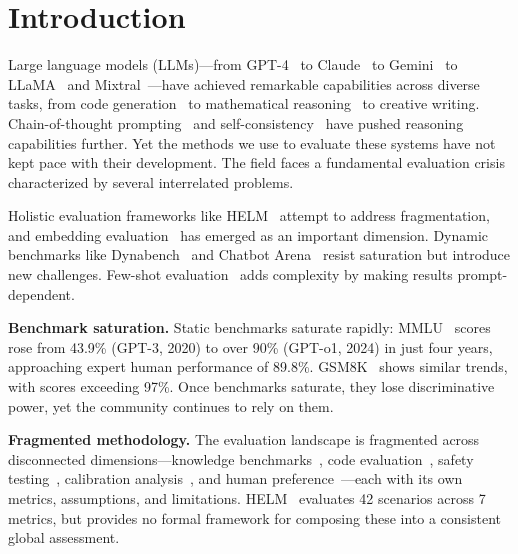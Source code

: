 \documentclass[11pt]{article}
\begin{document}
\section{Introduction}
\label{sec:intro}

Large language models (LLMs)---from GPT-4~\cite{openai2023gpt4} to Claude~\cite{anthropic2024claude3} to Gemini~\cite{gemini2024,geminiteam2024gemini15} to LLaMA~\cite{touvron2023llama,touvron2023llama2,dubey2024llama3} and Mixtral~\cite{jiang2024mixtral}---have achieved remarkable capabilities across diverse tasks, from code generation~\cite{chen2021evaluating} to mathematical reasoning~\cite{cobbe2021gsm8k} to creative writing. Chain-of-thought prompting~\cite{wei2022chain} and self-consistency~\cite{wang2023selfconsistency} have pushed reasoning capabilities further. Yet the methods we use to evaluate these systems have not kept pace with their development. The field faces a fundamental evaluation crisis characterized by several interrelated problems.

Holistic evaluation frameworks like HELM~\cite{liang2022helm} attempt to address fragmentation, and embedding evaluation~\cite{muennighoff2023mteb} has emerged as an important dimension. Dynamic benchmarks like Dynabench~\cite{kiela2021dynabench} and Chatbot Arena~\cite{chiang2024chatbot} resist saturation but introduce new challenges. Few-shot evaluation~\cite{brown2020language,perez2021true} adds complexity by making results prompt-dependent.

\textbf{Benchmark saturation.} Static benchmarks saturate rapidly: MMLU~\cite{hendrycks2021mmlu} scores rose from 43.9\% (GPT-3, 2020) to over 90\% (GPT-o1, 2024) in just four years, approaching expert human performance of 89.8\%. GSM8K~\cite{cobbe2021gsm8k} shows similar trends, with scores exceeding 97\%. Once benchmarks saturate, they lose discriminative power, yet the community continues to rely on them.

\textbf{Fragmented methodology.} The evaluation landscape is fragmented across disconnected dimensions---knowledge benchmarks~\cite{hendrycks2021mmlu,srivastava2022bigbench}, code evaluation~\cite{chen2021evaluating}, safety testing~\cite{zou2023universal}, calibration analysis~\cite{kadavath2022language}, and human preference~\cite{chiang2024chatbot}---each with its own metrics, assumptions, and limitations. HELM~\cite{liang2022helm} evaluates 42 scenarios across 7 metrics, but provides no formal framework for composing these into a consistent global assessment.
\end{document}
